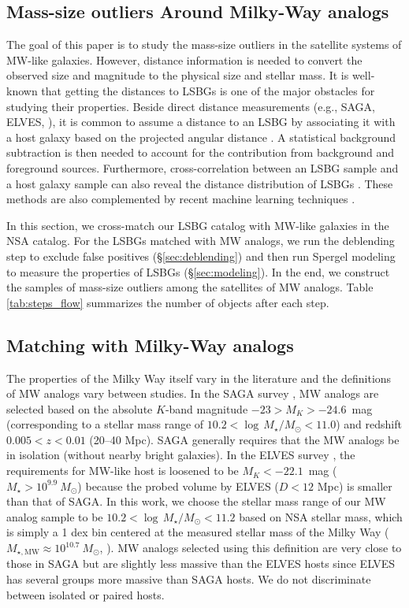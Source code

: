 \documentclass[twocolumn,astrosymb,twocolappendix]{aastex631}
\begin{document}
\begin{CJK*}{UTF8}{gbsn}
\section{Mass-size outliers Around Milky-Way analogs}\label{sec:sample_construction}
The goal of this paper is to study the mass-size outliers in the satellite systems of MW-like galaxies. However, distance information is needed to convert the observed size and magnitude to the physical size and stellar mass. It is well-known that getting the distances to LSBGs is one of the major obstacles for studying their properties. Beside direct distance measurements (e.g., SAGA, ELVES, \citealt{Kadowaki2021}), it is common to assume a distance to an LSBG by associating it with a host galaxy based on the projected angular distance \citep[e.g.,][]{vanDokkum2015,vdBurg2016,Wang2021,Zaritsky2022,Nashimoto2022}. A statistical background subtraction is then needed to account for the contribution from background and foreground sources. Furthermore, cross-correlation between an LSBG sample and a host galaxy sample can also reveal the distance distribution of LSBGs \citep{Greene2022}. These methods are also complemented by recent machine learning techniques \citep{Baxter2021,xSAGA-I}. 

In this section, we cross-match our LSBG catalog with MW-like galaxies in the NSA catalog. For the LSBGs matched with MW analogs, we run the deblending step to exclude false positives (\S\ref{sec:deblending}) and then run Spergel modeling to measure the properties of LSBGs (\S\ref{sec:modeling}). In the end, we construct the samples of mass-size outliers among the satellites of MW analogs. Table \ref{tab:steps_flow} summarizes the number of objects after each step. 

\subsection{Matching with Milky-Way analogs}\label{sec:match}
The properties of the Milky Way itself vary in the literature \citep{Licquia2015,Bland-Hawthorn2016} and the definitions of MW analogs vary between studies. In the SAGA survey \citep{SAGA-I,SAGA-II}, MW analogs are selected based on the absolute $K$-band magnitude $-23 > M_K > -24.6$~mag (corresponding to a stellar mass range of $10.2 < \log\, M_\star/M_\odot < 11.0$) and redshift $0.005 < z < 0.01$ (20--40 Mpc). SAGA generally requires that the MW analogs be in isolation (without nearby bright galaxies). In the ELVES survey \citep{ELVES-I,ELVES-II,CarlstenELVES2022}, the requirements for MW-like host is loosened to be $M_K < -22.1$~mag ($M_\star > 10^{9.9}\ M_\odot$) because the probed volume by ELVES ($D<12$ Mpc) is smaller than that of SAGA. In this work, we choose the stellar mass range of our MW analog sample to be $10.2 < \log\, M_\star/M_\odot < 11.2$ based on NSA stellar mass, which is simply a 1 dex bin centered at the measured stellar mass of the Milky Way ($M_{\star, \mathrm{MW}}\approx 10^{10.7}\ M_\odot$, \citealt{Licquia2015}). MW analogs selected using this definition are very close to those in SAGA but are slightly less massive than the ELVES hosts since ELVES has several groups more massive than SAGA hosts. We do not discriminate between isolated or paired hosts.


\end{CJK*}
\end{document}
